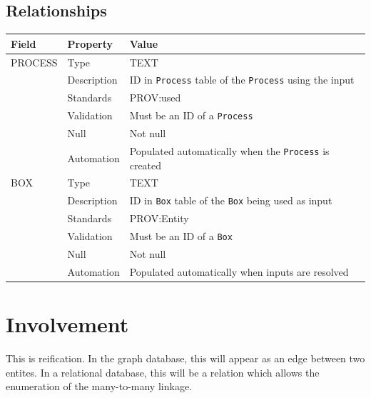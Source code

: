\documentclass[
]{article}
\newcounter{none} %
\begin{document}
\subsection{Relationships}\label{relationships-13}

{\def\LTcaptype{none} %
\begin{longtable}[]{@{}
  >{\raggedright\arraybackslash}p{}
  >{\raggedright\arraybackslash}p{}
  >{\raggedright\arraybackslash}p{}@{}}
\toprule\noalign{}
\begin{minipage}[b]{\linewidth}\raggedright
Field
\end{minipage} & \begin{minipage}[b]{\linewidth}\raggedright
Property
\end{minipage} & \begin{minipage}[b]{\linewidth}\raggedright
Value
\end{minipage} \\
\midrule\noalign{}
\endhead
\bottomrule\noalign{}
\endlastfoot
PROCESS & Type & TEXT \\
& Description & ID in \texttt{Process} table of the \texttt{Process}
using the input \\
& Standards & PROV:used \\
& Validation & Must be an ID of a \texttt{Process} \\
& Null & Not null \\
& Automation & Populated automatically when the \texttt{Process} is
created \\
BOX & Type & TEXT \\
& Description & ID in \texttt{Box} table of the \texttt{Box} being used
as input \\
& Standards & PROV:Entity \\
& Validation & Must be an ID of a \texttt{Box} \\
& Null & Not null \\
& Automation & Populated automatically when inputs are resolved \\
\end{longtable}
}

\section{Involvement}\label{involvement}

This is reification. In the graph database, this will appear as an edge
between two entites. In a relational database, this will be a relation
which allows the enumeration of the many-to-many linkage.
\end{document}
